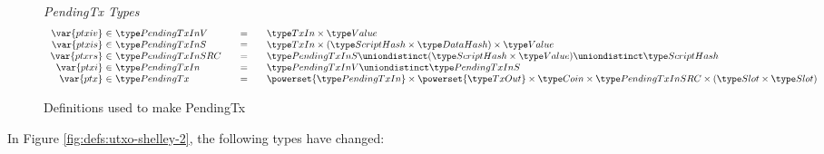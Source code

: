 \begin{figure*}[htb]
  \emph{PendingTx Types}
  \begin{equation*}
    \begin{array}{r@{~\in~}l@{\qquad=\qquad}l}
      \var{ptxiv}
      & \PendingTxInV
      & \TxIn \times \Value
      \\
      \var{ptxis}
      & \PendingTxInS
      & \TxIn \times (\HashScr \times \HashDat) \times \Value
      \\
      \var{ptxrs}
      & \PendingTxInSRC
      & \PendingTxInS \uniondistinct (\HashScr \times \Value) \uniondistinct \HashScr
      \\
      \var{ptxi}
      & \PendingTxIn
      & \PendingTxInV \uniondistinct \PendingTxInS
      \\
      \var{ptx}
      & \PendingTx
      & \powerset{\PendingTxIn} \times  \powerset{\TxOut} \times \Coin \times
      \PendingTxInSRC \times (\Slot\times\Slot)
      \\
    \end{array}
  \end{equation*}
  \caption{Definitions used to make PendingTx}
  \label{fig:defs:utxo-pending}
\end{figure*}


In Figure \ref{fig:defs:utxo-shelley-2}, the following types have changed:

